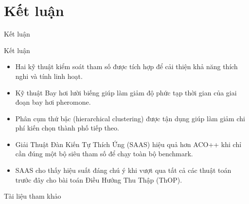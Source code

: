 \documentclass[aspectratio=169]{beamer}
\begin{document}
\section{Kết luận}
\begin{frame}{Kết luận}
    \begin{block}{Kết luận}
        \begin{itemize}
            \vspace{0.1cm}
            \item Hai kỹ thuật kiểm soát tham số được tích hợp để cải thiện khả năng thích nghi và tính linh hoạt.
            \vspace{0.1cm}
            \item Kỹ thuật Bay hơi lười biếng giúp làm giảm độ phức tạp thời gian của giai đoạn bay hơi pheromone.
            \vspace{0.1cm}
            \item Phân cụm thứ bậc (hierarchical clustering) được tận dụng giúp làm giảm chi phí kiến chọn thành phố tiếp theo.
            \pause
            \vspace{0.1cm}
            \item Giải Thuật Đàn Kiến Tự Thích Ứng (SAAS) hiệu quả hơn ACO++ khi chỉ cần đúng một bộ siêu tham số để chạy toàn bộ benchmark.
            \vspace{0.1cm}
            \item SAAS cho thấy hiệu suất đáng chú ý khi vượt qua tất cả các thuật toán trước đây cho bài toán Điều Hướng Thu Thập (ThOP).
            \vspace{0.1cm}
        \end{itemize}
        \vspace{0.1cm}
    \end{block}
\end{frame}
\begin{frame}{Tài liệu tham khảo}
    \printbibliography
\end{frame}
\end{document}
